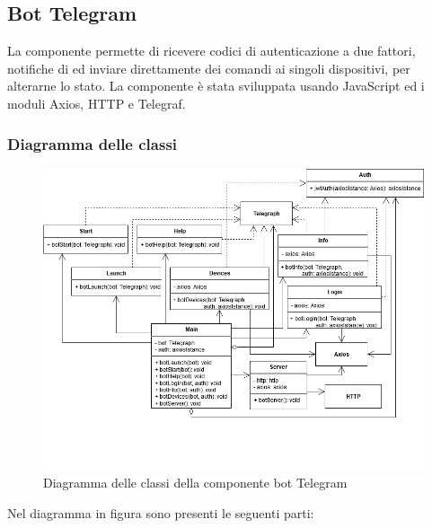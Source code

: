 \subsection{Bot Telegram}
	La componente  permette di ricevere codici di autenticazione a due fattori, notifiche di  ed inviare direttamente dei comandi ai singoli dispositivi, per alterarne lo stato.
	\newline
	La componente è stata sviluppata usando JavaScript ed i moduli Axios, HTTP e Telegraf.
	 
\subsubsection{Diagramma delle classi}%
	\begin{figure}[H]
		\centering
		\includegraphics[scale=0.600]{res/images/BOTTELEGRAM/ClassiTelegram.png}
		\caption{Diagramma delle classi della componente bot Telegram}
		\label{Diagramma 19}
	\end{figure}
	Nel diagramma in figura sono presenti le seguenti parti:
